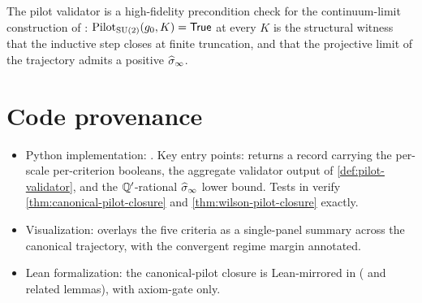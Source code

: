The pilot validator is a high-fidelity precondition check for the
continuum-limit construction of :
$\mathrm{Pilot}_{\mathrm{SU}(2)}(g_0, K) = \mathsf{True}$ at every
$K$ is the structural witness that the inductive step closes at
finite truncation, and that the projective limit of the trajectory
admits a positive $\widehat{\sigma}_\infty$.

\section{Code provenance}
\label{sec:pilot-codeanchor}

\begin{itemize}
  \item Python implementation:
    .  Key entry points:
    returns a  record carrying the
    per-scale per-criterion booleans, the aggregate validator
    output of \cref{def:pilot-validator}, and the
    $\mathbb{Q}'$-rational $\widehat{\sigma}_\infty$ lower bound.  Tests in
     verify
    \cref{thm:canonical-pilot-closure} and
    \cref{thm:wilson-pilot-closure} exactly.
  \item Visualization:
    overlays the five criteria as a single-panel summary across
    the canonical trajectory, with the convergent regime margin
    annotated.
  \item Lean formalization: the canonical-pilot closure is
    Lean-mirrored in 
    ( and related lemmas),
    with axiom-gate \codepath{[propext]} only.
\end{itemize}
